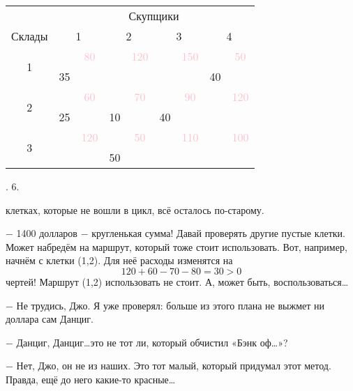 \newpage
\begin{minipage}[ht]{0.5\linewidth}
\begin{tabular}{|c|cc|cc|cc|cc|}
 \hline
 \rowcolor{cyan} \multirow{2}{*}{} & \multicolumn{8}{|c|}{Скупщики}\\
 \cline{2-9} \rowcolor{cyan}Склады&\multicolumn{2}{|c|}{1} & \multicolumn{2}{|c|}{2} & \multicolumn{2}{|c|}{3} & \multicolumn{2}{|c|}{4}\\
 \hline
 \multirow{2}{*}{1} & &\textcolor{pink}{80} & & \textcolor{pink}{120} & & \textcolor{pink}{150} & & \textcolor{pink}{50} \\
 & 35 & & & & & & 40 & \\
 \hline
 \multirow{2}{*}{2}& & \textcolor{pink}{60} & & \textcolor{pink}{70} & & \textcolor{pink}{90} & & \textcolor{pink}{120} \\
 & 25 & & 10 & & 40 & & & \\
 \hline
 \multirow{2}{*}{3}& & \textcolor{pink}{120} & & \textcolor{pink}{50} & & \textcolor{pink}{110} & & \textcolor{pink}{100} \\
 & & & 50 & & & & & \\
 \hline
\end{tabular}


\medskip
{}. 6.

\bigskip

 клетках, которые не вошли в цикл, всё осталось по-старому.

\setlength{\parindent}{3ex}$-$ 1400 долларов $-$ кругленькая сумма! Давай проверять другие пустые клетки. Может набредём на маршрут, который тоже стоит использовать. Вот, например, начнём с клетки (1,2). Для неё расходы изменятся на
\begin{equation*}
    120+60-70-80=30>0
\end{equation*}
 чертей! Маршрут (1,2) использовать не стоит. А, может быть, воспользоваться\ldots

$-$ Не трудись, Джо. Я уже проверял: больше из этого плана не выжмет ни доллара сам Данциг.

$-$ Данциг, Данциг\ldots это не тот ли, который обчистил «Бэнк оф\ldots»?

$-$ Нет, Джо, он не из наших. Это тот малый, который придумал этот метод. Правда, ещё до него какие-то красные\ldots
\end{minipage}\quad

